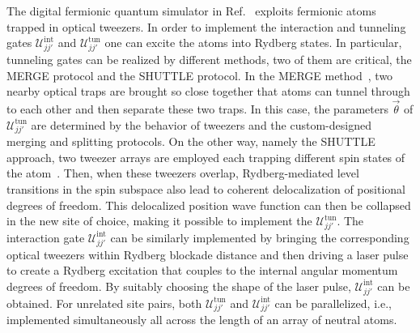 \documentclass[aps, pra, reprint, superscriptaddress]{revtex4-1}
\begin{document}
The digital fermionic quantum simulator in Ref.~\cite{gonzalez2023fermionic} exploits fermionic atoms trapped in optical tweezers. 
In order to implement the interaction and tunneling gates $\mathcal{U}_{jj'}^{\text{int}}$ and $\mathcal{U}_{jj'}^{\text{tun}}$ one can excite the atoms into Rydberg states. In particular, tunneling gates can be realized by different methods, two of them are critical, the MERGE protocol and the SHUTTLE protocol.
In the MERGE method~\cite{kaufman2014two, spar2022realization,young2022tweezer}, two nearby optical traps are brought so close together that atoms can tunnel through to each other and then separate these two traps. 
In this case, the parameters $\vec{\theta}$ of $\mathcal{U}_{jj'}^{\text{tun}}$ are determined by the behavior of tweezers and the custom-designed merging and splitting protocols. 
On the other way, namely the SHUTTLE approach, two tweezer arrays are employed each trapping different spin states of the atom~\cite{daley2008quantum}. Then, when these tweezers overlap, Rydberg-mediated level transitions in the spin subspace also lead to coherent delocalization of positional degrees of freedom. This delocalized position wave function can then be collapsed in the new site of choice, making it possible to implement the $\mathcal{U}_{jj'}^{\text{tun}}$.
The interaction gate $\mathcal{U}^{\text{int}}_{jj'}$ can be similarly implemented by bringing the corresponding optical tweezers within Rydberg blockade distance and then driving a laser pulse to create a Rydberg excitation that couples to the internal angular momentum degrees of freedom. By suitably choosing the shape of the laser pulse,  $\mathcal{U}^{\text{int}}_{jj'}$ \cite{levine2019parallel} can be obtained.
For unrelated site pairs, both $\mathcal{U}^{\text{tun}}_{jj'}$ and $\mathcal{U}^{\text{int}}_{jj'}$ can be parallelized, i.e., implemented simultaneously all across the length of an array of neutral atoms. 


\end{document}
